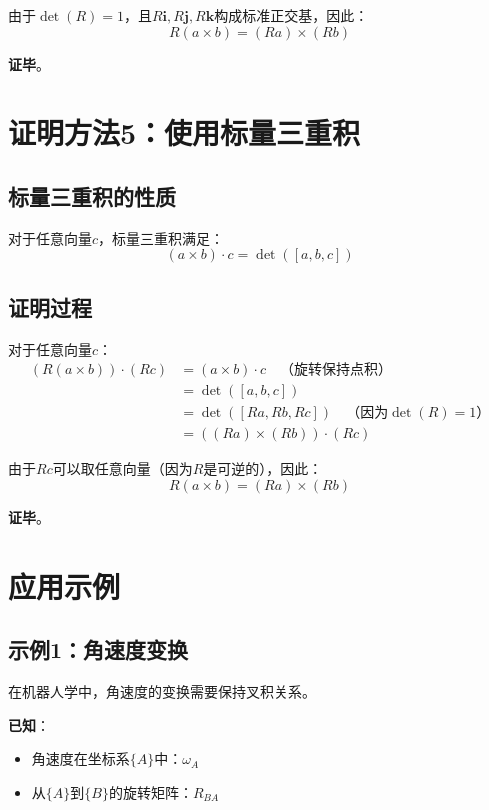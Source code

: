 \documentclass[12pt,a4paper]{article}
\begin{document}
由于$\det(R) = 1$，且$R\mathbf{i}, R\mathbf{j}, R\mathbf{k}$构成标准正交基，因此：
\begin{equation}
R(a \times b) = (Ra) \times (Rb)
\end{equation}

\textbf{证毕}。

\section{证明方法5：使用标量三重积}

\subsection{标量三重积的性质}

对于任意向量$c$，标量三重积满足：
\begin{equation}
(a \times b) \cdot c = \det([a, b, c])
\end{equation}

\subsection{证明过程}

对于任意向量$c$：
\begin{align}
(R(a \times b)) \cdot (Rc) &= (a \times b) \cdot c \quad \text{（旋转保持点积）} \\
&= \det([a, b, c]) \\
&= \det([Ra, Rb, Rc]) \quad \text{（因为$\det(R) = 1$）} \\
&= ((Ra) \times (Rb)) \cdot (Rc)
\end{align}

由于$Rc$可以取任意向量（因为$R$是可逆的），因此：
\begin{equation}
R(a \times b) = (Ra) \times (Rb)
\end{equation}

\textbf{证毕}。

\section{应用示例}

\subsection{示例1：角速度变换}

在机器人学中，角速度的变换需要保持叉积关系。

\textbf{已知}：
\begin{itemize}
\item 角速度在坐标系$\{A\}$中：$\omega_A$
\item 从$\{A\}$到$\{B\}$的旋转矩阵：$R_{BA}$
\end{itemize}
\end{document}
